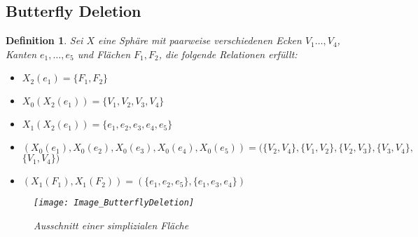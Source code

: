 \documentclass[12pt,titlepage,twoside,cleardoublepage]{article}
\theoremstyle{nummermitklammern}
\newtheorem{definition}[temp]{Definition}
\newtheorem{definition}[zahl]{Definition}
\numberwithin{equation}{section}
\begin{document}
  \subsection{Butterfly Deletion}
 \begin{definition}
 Sei $X$ eine Sphäre mit paarweise verschiedenen Ecken $V_1\ldots ,V_4$, Kanten $e_1,\ldots,e_5$ und Flächen $F_1,F_2$,
 die folgende Relationen erfüllt: 
 \begin{itemize}
 \item $X_2(e_1)=\{F_1,F_2\}$
 \item $X_0(X_2(e_1))=\{V_1,V_2,V_3,V_4\}$
 \item $X_1(X_2(e_1))=\{e_1,e_2,e_3,e_4,e_5\}$
 \item   $(X_0(e_1),X_0(e_2),X_0(e_3),X_0(e_4),X_0(e_5)) = (\{V_2,V_4\},\{V_1,V_2\},\{V_2,V_3\},\{V_3,V_4\},$ $\{V_1,V_4\})$
 \item $(X_1(F_1),X_1(F_2))=(\{e_1,e_2,e_5\},\{e_1,e_3,e_4\})$
\end{itemize}  

\begin{figure}[H]
\begin{center}
\texttt{[image: Image\_ButterflyDeletion]}
\end{center}
\caption{Ausschnitt einer simplizialen Fläche}
\end{figure}


\end{definition}
\end{document}
